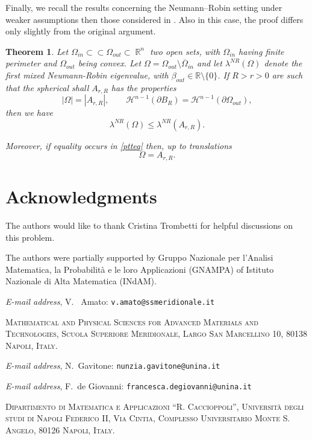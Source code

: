 \documentclass[oneside,a4paper,11pt,notitlepage]{article}
\makeatletter
\newcommand{\abs}[1]{{\left|#1\right|}}
\theoremstyle{plain}
\newtheorem{teor}{Theorem}
\numberwithin{teor}{section}
\numberwithin{equation}{section}
\newenvironment{teorema}{\begin{teor}}{\end{teor}}
\theoremstyle{definition}
\theoremstyle{plain}
\theoremstyle{plain}
\theoremstyle{plain}
\theoremstyle{plain}
\theoremstyle{definition}
\theoremstyle{definition}
\theoremstyle{plain}
\DeclareMathOperator{\R}{\mathbb{R}}
\newcommand{\Addresses}{{ 
 \bigskip

  \noindent\textit{E-mail address}, V. ~Amato: \texttt{v.amato@ssmeridionale.it} 

   \medskip 
 
  \noindent\textsc{Mathematical and Physical Sciences for Advanced Materials and Technologies, Scuola Superiore Meridionale, Largo San Marcellino 10, 80138 Napoli, Italy. } 


 \medskip
 \noindent\textit{E-mail address}, N.~Gavitone: \texttt{nunzia.gavitone@unina.it} 
 
 
  \medskip 
 
 \noindent\textit{E-mail address}, F.~de Giovanni: \texttt{francesca.degiovanni@unina.it} 
   \medskip 


 \noindent\textsc{Dipartimento di Matematica e Applicazioni ``R. Caccioppoli'', Universit\`a degli studi di Napoli Federico II, Via Cintia, Complesso Universitario Monte S. Angelo, 80126 Napoli, Italy.}
 
 
 
 \par\nopagebreak 

}}
\makeatother
\begin{document}
Finally, we recall the results concerning the Neumann–Robin setting under weaker assumptions then those considered in \cite[Theorem~3.1]{Paoli_Piscitelli_Trani}. Also in this case, the proof differs only slightly from the original argument.


\begin{teorema}\label{PPT}
    Let $\Omega_{in} \subset \subset \Omega_{out} \subset \R ^n$ two open sets, with $\Omega_{in}$ having finite perimeter and $\Omega_{out}$ being convex. Let $\Omega = \Omega_{out} \setminus\overline{\Omega}_{in}$ and let $\lambda^{NR}(\Omega)$ denote the first mixed Neumann-Robin eigenvalue, with $\beta_{out}\in \mathbb{R}\setminus \{0\}$.
    If $R>r>0$ are such that the spherical shall ${A}_{r,R}$ has the properties
    $$
    \abs{\Omega}= \abs{{A}_{r,R}}, \qquad \mathcal{H}^{n-1}(\partial B_R)=\mathcal{H}^{n-1}(\partial \Omega_{out}), $$ 
then we have
     \begin{equation}
         \label{ptteq}
     \lambda^{NR}(\Omega)\leq \lambda^{NR}({A}_{r,R}).
     \end{equation}

      Moreover, if equality occurs in \eqref{ptteq} then, up to translations
     $$\Omega= A_{r,R}.$$
\end{teorema}


\section*{Acknowledgments}
The authors would like to thank Cristina Trombetti for helpful discussions on this problem.

The authors were partially supported by Gruppo Nazionale per l’Analisi Matematica, la Probabilità e le loro Applicazioni
(GNAMPA) of Istituto Nazionale di Alta Matematica (INdAM). 





\Addresses
\end{document}
